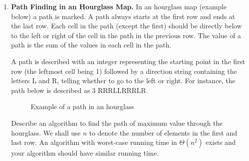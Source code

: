 \documentclass[11pt]{article}
\begin{document}
\begin{enumerate}
\item {\bf Path Finding in an Hourglass Map.} In an hourglass map (example below) a path is marked. A path always starts at the first row and ends at the last row. Each cell in the path (except the first) should be directly below to the left or right of the cell in the path in the previous row. The value of a path is the sum of the values in each cell in the path.

A path is described with an integer representing the starting point in the first row (the leftmost cell being 1) followed by a direction string containing the letters L and R, telling whether to go to the left or right. For instance, the path below is described as 3 RRRLLRRRLR.

	\begin{figure}[h] \centering
	\caption{Example of a path in an hourglass}
	\end{figure}

	Describe an algorithm to find the path of maximum value through the hourglass. We shall use $n$ to denote the number of elements in the first and last row. An algorithm with worst-case running time in $\Theta(n^2)$ exists and your algorithm should have similar running time.


\end{enumerate}
\end{document}
